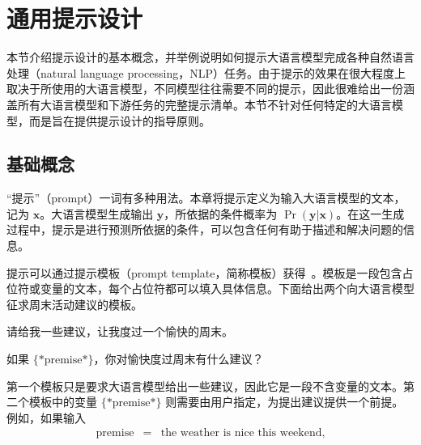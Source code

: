 \section{通用提示设计}

\noindent 本节介绍提示设计的基本概念，并举例说明如何提示大语言模型完成各种自然语言处理（natural language processing，NLP）任务。由于提示的效果在很大程度上取决于所使用的大语言模型，不同模型往往需要不同的提示，因此很难给出一份涵盖所有大语言模型和下游任务的完整提示清单。本节不针对任何特定的大语言模型，而是旨在提供提示设计的指导原则。

\subsection{基础概念}

\noindent “提示”（prompt）一词有多种用法。本章将提示定义为输入大语言模型的文本，记为 $\mathbf{x}$。大语言模型生成输出 $\mathbf{y}$，所依据的条件概率为 $\Pr(\mathbf{y}|\mathbf{x})$。在这一生成过程中，提示是进行预测所依据的条件，可以包含任何有助于描述和解决问题的信息。

提示可以通过提示模板（prompt template，简称模板）获得~\cite{liu-etal:2023pre}。模板是一段包含占位符或变量的文本，每个占位符都可以填入具体信息。下面给出两个向大语言模型征求周末活动建议的模板。

\vspace{0.5em}
\begin{tcolorbox}

\hspace{2em} 请给我一些建议，让我度过一个愉快的周末。

\hspace{2em} \underline{\hspace{2em}}
\end{tcolorbox}
\vspace{0.5em}

\vspace{0.5em}
\begin{tcolorbox}

\hspace{2em} 如果 $\{*\mathrm{premise}*\}$，你对愉快度过周末有什么建议？

\hspace{2em} \underline{\hspace{2em}}
\end{tcolorbox}
\vspace{0.5em}

第一个模板只是要求大语言模型给出一些建议，因此它是一段不含变量的文本。第二个模板中的变量 $\{*\mathrm{premise}*\}$ 则需要由用户指定，为提出建议提供一个前提。例如，如果输入
\begin{eqnarray}
\mathrm{premise} & = & \textrm{the weather is nice this weekend},
\end{eqnarray}

